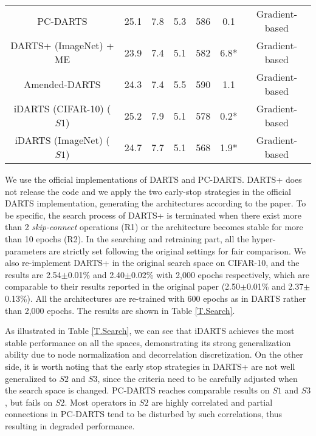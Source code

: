 \documentclass[journal]{IEEEtran}
\begin{document}
\begin{table*}[!htpb]
\begin{center}
{\begin{tabular}{c|c|c|c|c|c|c}
PC-DARTS \cite{DBLP:journals/corr/abs-1907-05737} & 25.1 & 7.8 & 5.3 & 586 & 0.1 & Gradient-based \\
DARTS+ (ImageNet) + ME \cite{DBLP:journals/corr/abs-1909-06035} & 23.9 & 7.4 & 5.1 & 582 & 6.8* &Gradient-based \\
Amended-DARTS \cite{DBLP:journals/corr/abs-1910-11831} & 24.3 & 7.4 & 5.5 & 590 & 1.1 & Gradient-based \\
\hline 
iDARTS (CIFAR-10) ($S1$) & 25.2 & 7.9 & 5.1 & 578 & 0.2* &Gradient-based\\
iDARTS (ImageNet) ($S1$) & 24.7 & 7.7 & 5.1 & 568 & 1.9* &Gradient-based \\
\hline
\hline
\end{tabular}}
\label{T.ImageNet}
\end{center}
\end{table*}


 

We use the official implementations of DARTS and PC-DARTS. DARTS+ does not release the code and we apply the two early-stop strategies in the official DARTS implementation, generating the architectures according to the paper. To be specific, the search process of DARTS+ is terminated when there exist more than 2 \textit{skip-connect} operations (R1) or the architecture becomes stable for more than 10 epochs (R2). In the searching and retraining part, all the hyper-parameters are strictly set following the original settings for fair comparison. We also re-implement DARTS+ in the original search space on CIFAR-10, and the results are 2.54$\pm$0.01\% and 2.40$\pm$0.02\% with 2,000 epochs respectively, which are comparable to their results reported in the original paper (2.50$\pm$0.01\% and 2.37$\pm$0.13\%). All the architectures are re-trained with 600 epochs as in DARTS rather than 2,000 epochs. The results are shown in Table \ref{T.Search}.

As illustrated in Table \ref{T.Search}, we can see that iDARTS achieves the most stable performance on all the spaces, demonstrating its strong generalization ability due to node normalization and decorrelation discretization. On the other side, it is worth noting that the early stop strategies in DARTS+ are not well generalized to $S2$ and $S3$, since the criteria need to be carefully adjusted when the search space is changed. 
PC-DARTS reaches comparable results on $S1$ and $S3$, but fails on $S2$. Most operators in $S2$ are highly correlated and partial connections in PC-DARTS tend to be disturbed by such correlations, thus resulting in degraded performance.
\end{document}
